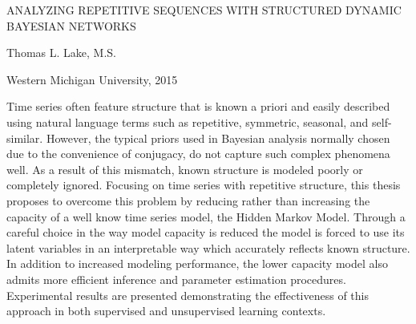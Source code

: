 \thispagestyle{empty}
\begin{center}
    ANALYZING REPETITIVE SEQUENCES WITH STRUCTURED DYNAMIC BAYESIAN NETWORKS

    \vspace{3\baselineskip}
    Thomas L. Lake, M.S.

    \vspace{\baselineskip}
    Western Michigan University, 2015
\end{center}
\vspace{3\baselineskip}
\hspace*{0.5in}
Time series often feature structure that is known a priori and easily described using
natural language terms such as repetitive, symmetric, seasonal, and self-similar.
However, the typical priors used in Bayesian analysis normally chosen due to the
convenience of conjugacy, do not capture such complex phenomena well.
As a result of this mismatch, known structure is modeled poorly or completely ignored.
Focusing on time series with repetitive structure, this thesis proposes to overcome this
problem by reducing rather than increasing the capacity of a well know time series model,
the Hidden Markov Model.
Through a careful choice in the way model capacity is reduced the model is forced to use
its latent variables in an interpretable way which accurately reflects known structure.
In addition to increased modeling performance, the lower capacity model also admits more
efficient inference and parameter estimation procedures.
Experimental results are presented demonstrating the effectiveness of this approach
in both supervised and unsupervised learning contexts.
\newpage
\restoregeometry
